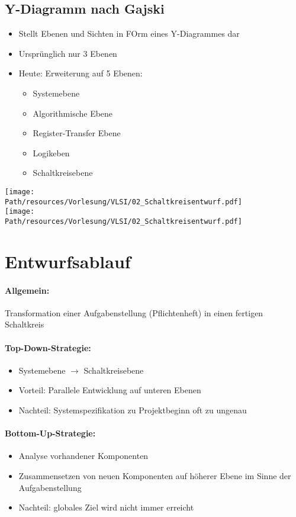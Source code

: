 \subsection{Y-Diagramm nach Gajski}
	\begin{itemize}
		\item Stellt Ebenen und Sichten in FOrm eines Y-Diagrammes dar
		\item Ursprünglich nur 3 Ebenen
		\item Heute: Erweiterung auf 5 Ebenen:
			\begin{itemize}
				\item Systemebene
				\item Algorithmische Ebene
				\item Register-Transfer Ebene
				\item Logikeben
				\item Schaltkreisebene
			\end{itemize}
	\end{itemize}
	\begin{center}
		\texttt{[image: \\Path/resources/Vorlesung/VLSI/02\_Schaltkreisentwurf.pdf]}
		\\\texttt{[image: \\Path/resources/Vorlesung/VLSI/02\_Schaltkreisentwurf.pdf]}
	\end{center}
	
\newpage
\section{Entwurfsablauf}
	\paragraph{Allgemein:} Transformation einer Aufgabenstellung (Pflichtenheft) in einen fertigen Schaltkreis
	\paragraph{Top-Down-Strategie:}
		\begin{itemize}
			\item Systemebene $\rightarrow$ Schaltkreisebene
			\item Vorteil: Parallele Entwicklung auf unteren Ebenen
			\item Nachteil: Systemspezifikation zu Projektbeginn oft zu ungenau
		\end{itemize}
	\paragraph{Bottom-Up-Strategie:}
		\begin{itemize}
			\item Analyse vorhandener Komponenten
			\item Zusammensetzen von neuen Komponenten auf höherer Ebene im Sinne der Aufgabenstellung
			\item Nachteil: globales Ziel wird nicht immer erreicht
		\end{itemize}
